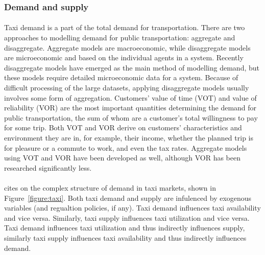 \subsubsection{Demand and supply}
\label{sec:literature:taxis:demand}

\paragraph{} Taxi demand is a part of the total demand for transportation.
There are two approaches to modelling demand for public transportation:
aggregate and disaggregate. Aggregate models are macroeconomic, while
disaggregate models are microeconomic and based on the individual agents in a
system. Recently disaggregate models have emerged as the main method of
modelling demand, but these models require detailed microeconomic data for a
system. Because of difficult processing of the large datasets, applying
disaggregate models usually involves some form of aggregation. Customers' value
of time (VOT) and value of reliability (VOR) are the most important quantities
determining the demand for public transportation, the sum of whom are a
customer's total willingness to pay for some trip. Both VOT and VOR derive on
customers' characteristics and environment they are in, for example, their
income, whether the planned trip is for pleasure or a commute to work, and even
the tax rates. Aggregate models using VOT and VOR have been developed as well,
although VOR has been researched significantly less.
\parencite{Small2007taxi+urban}

\paragraph{} \textcite{Yang2002taxi+demand} cites
\textcite{Manski1967taxi+demand} on the complex structure of demand in taxi
markets, shown in Figure~\ref{figure:taxi}. Both taxi demand and supply are
infulenced by exogenous variables (and regualtion policies, if any). Taxi
demand influences taxi availability and vice versa. Similarly, taxi supply
influences taxi utilization and vice versa. Taxi demand influences taxi
utilization and thus indirectly influences supply, similarly taxi supply
influences taxi availability and thus indirectly influences demand. 

